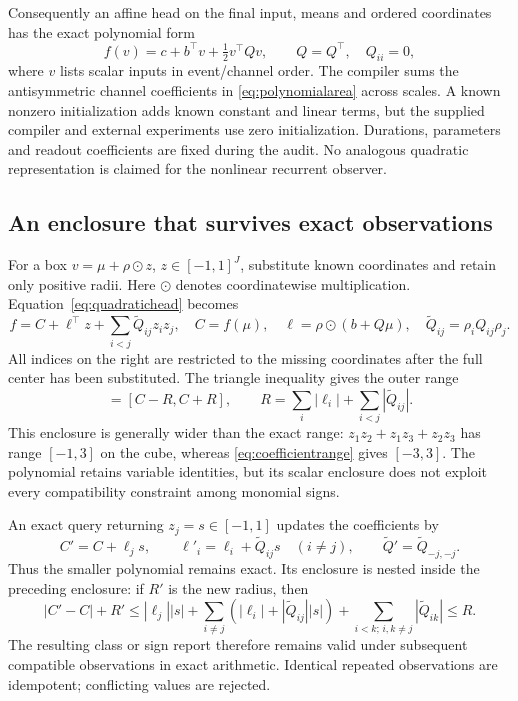 \documentclass[11pt,a4paper]{article}
\theoremstyle{definition}\newtheorem{definition}[theorem]{Definition}
\begin{document}
Consequently an affine head on the final input, means and ordered coordinates has the exact polynomial form
\begin{equation}
 f(v)=c+b^\top v+\tfrac12v^\top Qv,
 \qquad Q=Q^\top,\quad Q_{ii}=0,\label{eq:quadratichead}
\end{equation}
where $v$ lists scalar inputs in event/channel order. The compiler sums the antisymmetric channel coefficients in \eqref{eq:polynomialarea} across scales. A known nonzero initialization adds known constant and linear terms, but the supplied compiler and external experiments use zero initialization. Durations, parameters and readout coefficients are fixed during the audit. No analogous quadratic representation is claimed for the nonlinear recurrent observer.

\subsection{An enclosure that survives exact observations}
For a box $v=\mu+\rho\odot z$, $z\in[-1,1]^J$, substitute known coordinates and retain only positive radii. Here $\odot$ denotes coordinatewise multiplication. Equation~\eqref{eq:quadratichead} becomes
\begin{equation}
 f=C+\ell^\top z+\sum_{i<j}\widetilde Q_{ij}z_iz_j,
 \quad C=f(\mu),\quad
 \ell=\rho\odot(b+Q\mu),\quad
 \widetilde Q_{ij}=\rho_iQ_{ij}\rho_j.\label{eq:centered}
\end{equation}
All indices on the right are restricted to the missing coordinates after the full center has been substituted. The triangle inequality gives the outer range
\begin{equation}
 [\underline f,\overline f]=[C-R,C+R],\qquad
 R=\sum_i|\ell_i|+\sum_{i<j}|\widetilde Q_{ij}|.
 \label{eq:coefficientrange}
\end{equation}
This enclosure is generally wider than the exact range: $z_1z_2+z_1z_3+z_2z_3$ has range $[-1,3]$ on the cube, whereas \eqref{eq:coefficientrange} gives $[-3,3]$. The polynomial retains variable identities, but its scalar enclosure does not exploit every compatibility constraint among monomial signs.

An exact query returning $z_j=s\in[-1,1]$ updates the coefficients by
\begin{equation}
 C'=C+\ell_js,\qquad
 \ell'_i=\ell_i+\widetilde Q_{ij}s\quad(i\ne j),\qquad
 \widetilde Q'=\widetilde Q_{-j,-j}.\label{eq:polyquery}
\end{equation}
Thus the smaller polynomial remains exact. Its enclosure is nested inside the preceding enclosure: if $R'$ is the new radius, then
\[
 |C'-C|+R'
 \leq |\ell_j||s|+\sum_{i\ne j}(|\ell_i|+|\widetilde Q_{ij}||s|)
             +\sum_{i<k;\,i,k\ne j}|\widetilde Q_{ik}|\leq R.
\]
The resulting class or sign report therefore remains valid under subsequent compatible observations in exact arithmetic. Identical repeated observations are idempotent; conflicting values are rejected.
\end{document}
